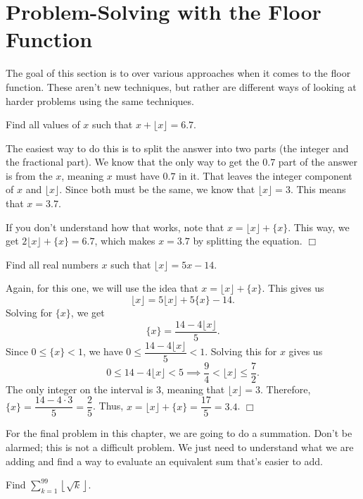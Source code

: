 \documentclass[../book.tex]{subfiles}
\begin{document}
\section{Problem-Solving with the Floor Function}
\noindent The goal of this section is to over various approaches when it comes to the floor function.  These aren't new techniques, but rather are different ways of looking at harder problems using the same techniques.
\begin{example}
Find all values of $x$ such that $x+\lfloor{x}\rfloor=6.7$.
\end{example}
\begin{solution}
The easiest way to do this is to split the answer into two parts (the integer and the fractional part). We know that the only way to get the $0.7$ part of the answer is from the $x$, meaning $x$ must have $0.7$ in it.  That leaves the integer component of $x$ and $\lfloor{x}\rfloor$.  Since both must be the same, we know that $\lfloor{x}\rfloor=3$.  This means that $x=3.7$.

If you don't understand how that works, note that $x=\lfloor{x}\rfloor+\{x\}$.  This way, we get $2\lfloor{x}\rfloor+\{x\}=6.7$, which makes $x=3.7$ by splitting the equation. $\Box$
\end{solution}
\begin{example}
Find all real numbers $x$ such that $\lfloor{x}\rfloor=5x-14$.
\end{example}
\begin{solution}
Again, for this one, we will use the idea that $x=\lfloor{x}\rfloor+\{x\}$.  This gives us $$\lfloor{x}\rfloor=5\lfloor{x}\rfloor+5\{x\}-14.$$  Solving for $\{x\}$, we get $$\{x\}=\dfrac{14-4\lfloor{x}\rfloor}{5}.$$  Since $0\leq \{x\}<1$, we have $0\leq \dfrac{14-4\lfloor{x}\rfloor}{5}<1$.  Solving this for $x$ gives us $$0\leq 14-4\lfloor{x}\rfloor<5 \implies \dfrac{9}{4}<\lfloor{x}\rfloor\leq \dfrac{7}{2}.$$  The only integer on the interval is $3$, meaning that $\lfloor{x}\rfloor=3$.  Therefore, $\{x\}=\dfrac{14-4\cdot 3}{5}=\dfrac{2}{5}$.  Thus, $x=\lfloor{x}\rfloor+\{x\}=\dfrac{17}{5}=3.4$. $\Box$
\end{solution}
For the final problem in this chapter, we are going to do a summation.  Don't be alarmed; this is not a difficult problem.  We just need to understand what we are adding and find a way to evaluate an equivalent sum that's easier to add.
\begin{example}
Find $\displaystyle \sum_{k=1}^{99}{\left\lfloor{\sqrt{k}}\right\rfloor}$.
\end{example}
\end{document}
